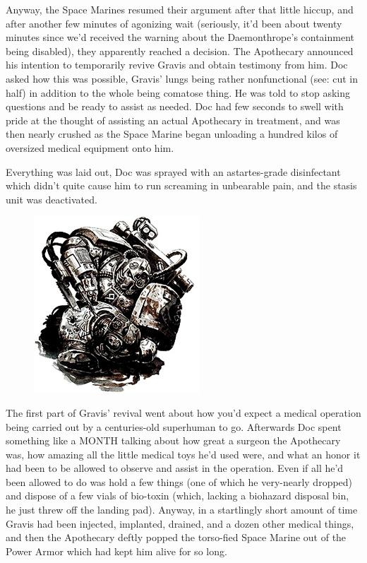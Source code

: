 Anyway, the Space Marines resumed their argument after that little hiccup, and after another few minutes of agonizing wait (seriously, it'd been about twenty minutes since we'd received the warning about the Daemonthrope's containment being disabled), they apparently reached a decision. 
The Apothecary announced his intention to temporarily revive Gravis and obtain testimony from him. 
Doc asked how this was possible, Gravis' lungs being rather nonfunctional (see: 
cut in half) in addition to the whole being comatose thing. 
He was told to stop asking questions and be ready to assist as needed. 
Doc had  few seconds to swell with pride at the thought of assisting an actual Apothecary in treatment, and was then nearly crushed as the Space Marine began unloading a hundred kilos of oversized medical equipment onto him.

Everything was laid out, Doc was sprayed with an astartes-grade disinfectant which didn't quite cause him to run screaming in unbearable pain, and the stasis unit was deactivated.

\begin{figure}
	\begin{center}
		\includegraphics[width=\figwidth]{pics/16/13.png}
	\end{center}
\end{figure}
The first part of Gravis' revival went about how you'd expect a medical operation being carried out by a centuries-old superhuman to go. 
Afterwards Doc spent something like a MONTH talking about how great a surgeon the Apothecary was, how amazing all the little medical toys he'd used were, and what an honor it had been to be allowed to observe and assist in the operation. 
Even if all he'd been allowed to do was hold a few things (one of which he very-nearly dropped) and dispose of a few vials of bio-toxin (which, lacking a biohazard disposal bin, he just threw off the landing pad). 
Anyway, in a startlingly short amount of time Gravis had been injected, implanted, drained, and a dozen other medical things, and then the Apothecary deftly popped the torso-fied Space Marine out of the Power Armor which had kept him alive for so long. 


